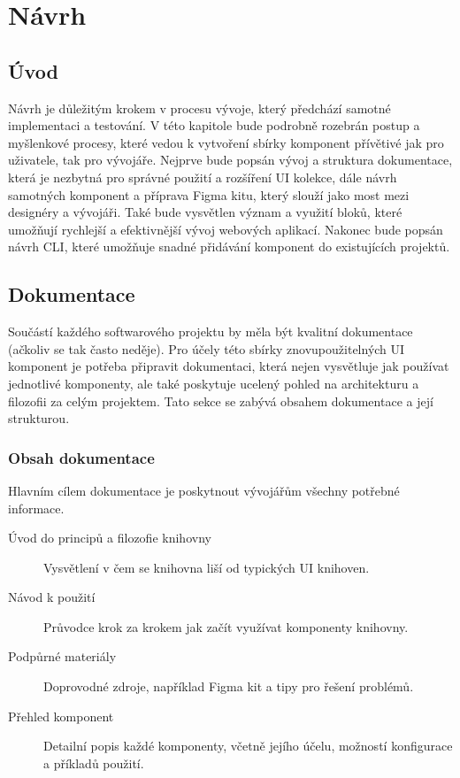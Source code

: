 
\chapter{Návrh}

\section{Úvod}
Návrh je důležitým krokem v procesu vývoje, který předchází samotné implementaci a testování. V této kapitole bude podrobně rozebrán postup a myšlenkové procesy, které vedou k vytvoření sbírky komponent přívětivé jak pro uživatele, tak pro vývojáře. Nejprve bude popsán vývoj a struktura dokumentace, která je nezbytná pro správné použití a rozšíření UI kolekce, dále návrh samotných komponent a příprava Figma kitu, který slouží jako most mezi designéry a vývojáři. Také bude vysvětlen význam a využití bloků, které umožňují rychlejší a efektivnější vývoj webových aplikací. Nakonec bude popsán návrh CLI, které umožňuje snadné přidávání komponent do existujících projektů.

\clearpage

\section{Dokumentace}
Součástí každého softwarového projektu by měla být kvalitní dokumentace (ačkoliv se tak často neděje). Pro účely této sbírky znovupoužitelných UI komponent je potřeba připravit dokumentaci, která nejen vysvětluje jak používat jednotlivé komponenty, ale také poskytuje ucelený pohled na architekturu a filozofii za celým projektem. Tato sekce se zabývá obsahem dokumentace a její strukturou.

\subsection{Obsah dokumentace}
Hlavním cílem dokumentace je poskytnout vývojářům všechny potřebné informace.

\begin{description}
  \item[Úvod do principů a filozofie knihovny] Vysvětlení v čem se knihovna liší od typických UI knihoven.
  \item[Návod k použití] Průvodce krok za krokem jak začít využívat komponenty knihovny.
  \item[Podpůrné materiály] Doprovodné zdroje, například Figma kit a tipy pro řešení problémů.
  \item[Přehled komponent] Detailní popis každé komponenty, včetně jejího účelu, možností konfigurace a příkladů použití.
\end{description}

